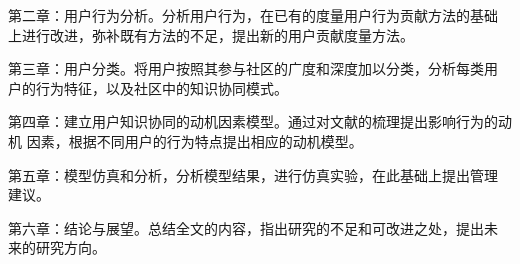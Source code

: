 第二章：用户行为分析。分析用户行为，在已有的度量用户行为贡献方法的基础
上进行改进，弥补既有方法的不足，提出新的用户贡献度量方法。

第三章：用户分类。将用户按照其参与社区的广度和深度加以分类，分析每类用
户的行为特征，以及社区中的知识协同模式。

第四章：建立用户知识协同的动机因素模型。通过对文献的梳理提出影响行为的动机
因素，根据不同用户的行为特点提出相应的动机模型。

第五章：模型仿真和分析，分析模型结果，进行仿真实验，在此基础上提出管理
建议。

第六章：结论与展望。总结全文的内容，指出研究的不足和可改进之处，提出未
来的研究方向。







  



